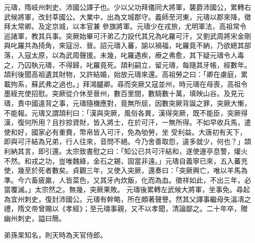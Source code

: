 \begin{pinyinscope}
 元璹，隋岐州刺史、沛國公譯子也。少以父功拜儀同大將軍，襲爵沛國公，累轉右武候將軍，改封莘國公。大業中，出為文城郡守。義師至河東，元璹以郡來降，徵拜太常卿。及定京城，以本官兼
 參旗將軍。元璹少在戎旅，尤明軍法，高祖常令巡諸軍，教其兵事。突厥始畢可汗弟乙力設代其兄為叱羅可汗，又劉武周將宋金剛與叱羅共為掎角，來寇汾、晉。詔元璹入蕃，諭以禍福，叱羅竟不納，乃欲總其部落，入寇太原，以為武周聲援。未幾，叱羅遇疾，療之弗愈，其下疑元璹令人毒之，乃囚執元璹，不得歸，叱羅竟死。頡利嗣立，留元璹，每隨其牙帳，經數年。頡利後聞高祖遺其財物，又許結婚，始放元璹來還。高祖勞之曰：「卿在虜庭，累
 載拘系，蘇武弗之過也。」拜鴻臚卿。尋而突厥又寇並州，時元璹在母喪，高祖令墨絰充使招慰。突厥從介休至晉州，數百里間，數騎數十萬，填映山谷。及見元璹，責中國違背之事，元璹隨機應對，竟無所屈，因數突厥背誕之罪，突厥大慚，不能報。元璹又謂頡利曰：「漢與突厥，風俗各異，漢得突厥，既不能臣，突厥得漢，復何所用？且抄掠資財，皆入將士，在於可汗，一無所得。不如早收兵馬，遣使和好，國家必有重賚，幣帛皆入可汗，免為劬勞，坐
 受利益。大唐初有天下，即與可汗結為兄弟，行人往來，音問不絕。今乃舍善取怨，違多就少，何也？」頡利納其言，即引還。太宗致書慰之曰：「知公已共可汗結和，遂使邊亭息警，爟火不然。和戎之功，豈唯魏絳，金石之錫，固當非遠。」元璹自義寧已來，五入蕃充使，幾至於死者數矣。貞觀三年，又使入突厥，還奏曰：「突厥興亡，唯以羊馬為準。今六畜疲羸，人皆菜色，又其牙內炊飯，化而為血。徵祥如此，不出三年，必當覆滅。」太宗然之。無幾，突厥果敗。
 元璹後累轉左武候大將軍，坐事免。尋起為宜州刺史，復封沛國公。元璹有幹略，所在頗著聲譽。然其父譯事繼母失溫凊之禮，隋文帝曾賜以《孝經》；至元璹事親，又不以孝聞，清論鄙之。二十年卒，贈幽州刺史，謚曰簡。



 弟孫杲知名，則天時為天官侍郎。




\end{pinyinscope}
